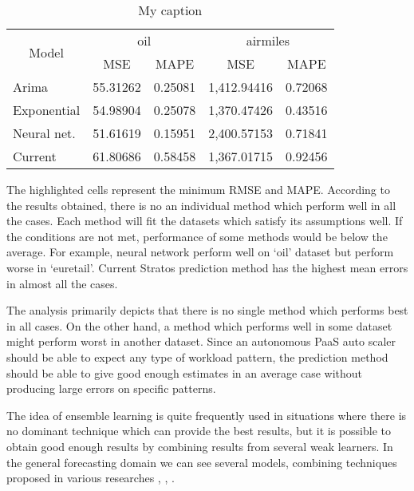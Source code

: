 \begin{table}[]
\centering
\caption{My caption}
\label{my-label}
\begin{tabular}{|l|r|r|r|r|}
\hline
\multicolumn{1}{|c|}{\multirow{2}{*}{Model}} & \multicolumn{2}{c|}{oil}                             & \multicolumn{2}{c|}{airmiles}                        \\ \cline{2-5} 
\multicolumn{1}{|c|}{}                       & \multicolumn{1}{c|}{MSE} & \multicolumn{1}{c|}{MAPE} & \multicolumn{1}{c|}{MSE} & \multicolumn{1}{c|}{MAPE} \\ \hline
Arima                                        & 55.31262                 & 0.25081                   & 1,412.94416              & 0.72068                   \\ \hline
Exponential                                  & 54.98904                 & 0.25078                   & 1,370.47426              & 0.43516                   \\ \hline
Neural net.                                         & 51.61619                 & 0.15951                   & 2,400.57153              & 0.71841                   \\ \hline
Current                                      & 61.80686                 & 0.58458                   & 1,367.01715              & 0.92456                   \\ \hline
\end{tabular}
\end{table}

The highlighted cells represent the minimum RMSE and MAPE. According to the results obtained, there is no an individual method which perform well in all the cases. Each method will fit the datasets which satisfy its assumptions well. If the conditions are not met, performance of some methods would be below the average. For example, neural network perform well on ‘oil’ dataset but perform worse in ‘euretail’. Current Stratos prediction method has the highest mean errors in almost all the cases.

The analysis primarily depicts that there is no single method which performs best in all cases. On the other hand, a method which performs well in some dataset might perform worst in another dataset.
Since an autonomous PaaS auto scaler should be able to expect any type of workload pattern, the prediction method should be able to give good enough estimates in an average case without producing large errors on specific patterns.

The idea of ensemble learning is quite frequently used in situations where there is no dominant technique which can provide the best results, but it is possible to obtain good enough results by combining results from several weak learners. In the general forecasting domain we can see several models, combining techniques proposed in various researches \cite{Zou_2004}, \cite{Wagner_2011},
\cite{Zhang_2003}.  

